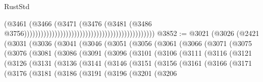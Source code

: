 \begin{lexlean}{RustStd}
\begin{coremodule}
                                                                                      (@3461
                                                                                        (@3466
                                                                                          (@3471
                                                                                            (@3476
                                                                                              (@3481
                                                                                                (@3486
                                                                                                  @3756)))))))))))))))))))))))))))))))))))))))))))))))
@3852 := @3021
    (@3026
      (@2421
        (@3031
          (@3036
            (@3041
              (@3046
                (@3051
                  (@3056
                    (@3061
                      (@3066
                        (@3071
                          (@3075
                            (@3076
                              (@3081
                                (@3086
                                  (@3091
                                    (@3096
                                      (@3101
                                        (@3106
                                          (@3111
                                            (@3116
                                              (@3121
                                                (@3126
                                                  (@3131
                                                    (@3136
                                                      (@3141
                                                        (@3146
                                                          (@3151
                                                            (@3156
                                                              (@3161
                                                                (@3166
                                                                  (@3171
                                                                    (@3176
                                                                      (@3181
                                                                        (@3186
                                                                          (@3191
                                                                            (@3196
                                                                              (@3201
                                                                                (@3206

\end{coremodule}
\end{lexlean}
